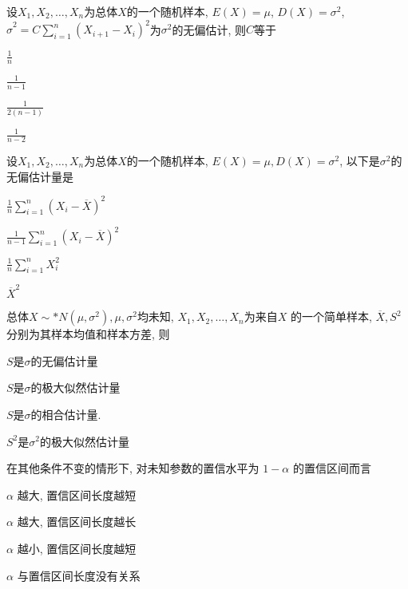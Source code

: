 \documentclass{exam-zh}
\begin{document}
\begin{question}
  设$X_1, X_2, \dots, X_n$为总体$X$的一个随机样本, $E(X) = \mu$, $D(X) = \sigma^2$, $\hat{\sigma}^2 = C\sum_{i=1}^{n}(X_{i+1} - X_i)^2$为$\sigma^2$的无偏估计, 则$C$等于 \paren[C]
  
  \begin{choices}
    \item $\frac{1}{n}$
    \item $\frac{1}{n-1}$
    \item $\frac{1}{2(n-1)}$
    \item $\frac{1}{n-2}$
  \end{choices}
\end{question}

\begin{question}
  设$X_1, X_2, \dots, X_n$为总体$X$的一个随机样本, $E(X) = \mu, D(X) = \sigma^2$, 以下是$\sigma^2$的无偏估计量是 \paren[B]
  
  \begin{choices}
    \item $\frac{1}{n}\sum_{i=1}^{n}(X_i - \overline{X})^2$
    \item $\frac{1}{n-1}\sum_{i=1}^{n}(X_i - \overline{X})^2$
    \item $\frac{1}{n}\sum_{i=1}^{n}X_i^2$
    \item $\overline{X}^2$
  \end{choices}
\end{question}

\begin{question}
  总体$X \sim* N(\mu, \sigma^2), \mu, \sigma^2$均未知, $X_1, X_2, \dots, X_n$为来自$X$ 的一个简单样本, $\overline{X}, S^2$分别为其样本均值和样本方差, 则 \paren[C]
  
  \begin{choices}
      \item $S$是$\sigma$的无偏估计量
      \item $S$是$\sigma$的极大似然估计量
      \item $S$是$\sigma$的相合估计量.
      \item $S^2$是$\sigma^2$的极大似然估计量
  \end{choices}
\end{question}

\begin{question}
  在其他条件不变的情形下, 对未知参数的置信水平为 $1-\alpha$ 的置信区间而言 \paren[A]
  
  \begin{choices}
    \item $\alpha$ 越大, 置信区间长度越短
    \item $\alpha$ 越大, 置信区间长度越长
    \item $\alpha$ 越小, 置信区间长度越短
    \item $\alpha$ 与置信区间长度没有关系
  \end{choices}
\end{question}
\end{document}
